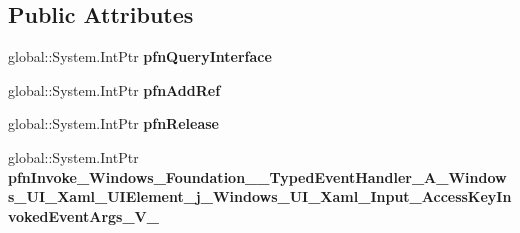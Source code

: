 \subsection*{Public Attributes}
\begin{DoxyCompactItemize}
\item 
\mbox{\label{struct_windows_1_1_foundation_1_1_typed_event_handler___a___windows___u_i___xaml___u_i_element__faa94360fa5e602dc59cfec6def5e27f_a392e3c2086a56f4629270257e061b5aa}} 
global\+::\+System.\+Int\+Ptr {\bfseries pfn\+Query\+Interface}
\item 
\mbox{\label{struct_windows_1_1_foundation_1_1_typed_event_handler___a___windows___u_i___xaml___u_i_element__faa94360fa5e602dc59cfec6def5e27f_a8433c84f9c181d38ba8337d1c6c427eb}} 
global\+::\+System.\+Int\+Ptr {\bfseries pfn\+Add\+Ref}
\item 
\mbox{\label{struct_windows_1_1_foundation_1_1_typed_event_handler___a___windows___u_i___xaml___u_i_element__faa94360fa5e602dc59cfec6def5e27f_aa4fdd3b43b93c0a8133321f5de6f7781}} 
global\+::\+System.\+Int\+Ptr {\bfseries pfn\+Release}
\item 
\mbox{\label{struct_windows_1_1_foundation_1_1_typed_event_handler___a___windows___u_i___xaml___u_i_element__faa94360fa5e602dc59cfec6def5e27f_a33907201cc145ff93bbba0ab94243ba1}} 
global\+::\+System.\+Int\+Ptr {\bfseries pfn\+Invoke\+\_\+\+Windows\+\_\+\+Foundation\+\_\+\+\_\+\+Typed\+Event\+Handler\+\_\+\+A\+\_\+\+Windows\+\_\+\+U\+I\+\_\+\+Xaml\+\_\+\+U\+I\+Element\+\_\+j\+\_\+\+Windows\+\_\+\+U\+I\+\_\+\+Xaml\+\_\+\+Input\+\_\+\+Access\+Key\+Invoked\+Event\+Args\+\_\+\+V\+\_\+}
\end{DoxyCompactItemize}
